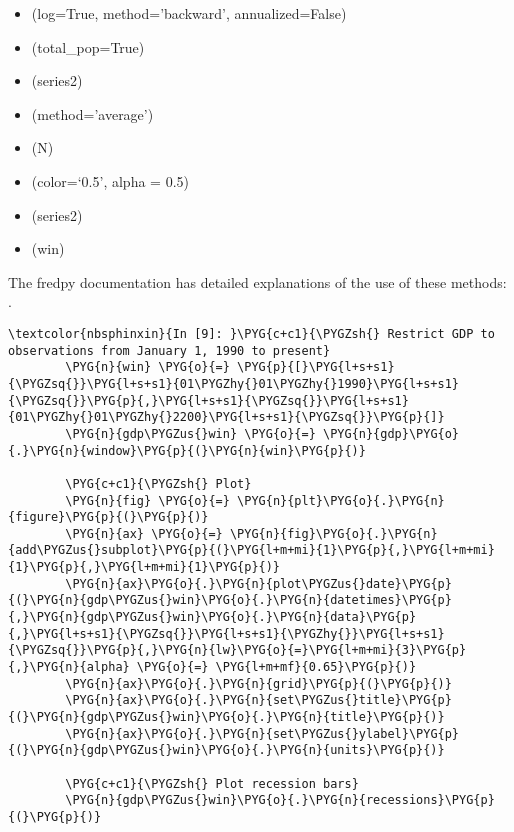 \documentclass[letterpaper,10pt,openany,oneside,english]{sphinxmanual}
\begin{document}
\begin{itemize}
\item {} 
(log=True, method=’backward’, annualized=False)

\item {} 
(total\_pop=True)

\item {} 
(series2)

\item {} 
(method=’average’)

\item {} 
(N)

\item {} 
(color=‘0.5’, alpha = 0.5)

\item {} 
(series2)

\item {} 
(win)

\end{itemize}

The fredpy documentation has detailed explanations of the use of these methods: .

%
\begin{Verbatim}[commandchars=\\\{\}]
\textcolor{nbsphinxin}{In [9]: }\PYG{c+c1}{\PYGZsh{} Restrict GDP to observations from January 1, 1990 to present}
        \PYG{n}{win} \PYG{o}{=} \PYG{p}{[}\PYG{l+s+s1}{\PYGZsq{}}\PYG{l+s+s1}{01\PYGZhy{}01\PYGZhy{}1990}\PYG{l+s+s1}{\PYGZsq{}}\PYG{p}{,}\PYG{l+s+s1}{\PYGZsq{}}\PYG{l+s+s1}{01\PYGZhy{}01\PYGZhy{}2200}\PYG{l+s+s1}{\PYGZsq{}}\PYG{p}{]}
        \PYG{n}{gdp\PYGZus{}win} \PYG{o}{=} \PYG{n}{gdp}\PYG{o}{.}\PYG{n}{window}\PYG{p}{(}\PYG{n}{win}\PYG{p}{)}
        
        \PYG{c+c1}{\PYGZsh{} Plot}
        \PYG{n}{fig} \PYG{o}{=} \PYG{n}{plt}\PYG{o}{.}\PYG{n}{figure}\PYG{p}{(}\PYG{p}{)}
        \PYG{n}{ax} \PYG{o}{=} \PYG{n}{fig}\PYG{o}{.}\PYG{n}{add\PYGZus{}subplot}\PYG{p}{(}\PYG{l+m+mi}{1}\PYG{p}{,}\PYG{l+m+mi}{1}\PYG{p}{,}\PYG{l+m+mi}{1}\PYG{p}{)}
        \PYG{n}{ax}\PYG{o}{.}\PYG{n}{plot\PYGZus{}date}\PYG{p}{(}\PYG{n}{gdp\PYGZus{}win}\PYG{o}{.}\PYG{n}{datetimes}\PYG{p}{,}\PYG{n}{gdp\PYGZus{}win}\PYG{o}{.}\PYG{n}{data}\PYG{p}{,}\PYG{l+s+s1}{\PYGZsq{}}\PYG{l+s+s1}{\PYGZhy{}}\PYG{l+s+s1}{\PYGZsq{}}\PYG{p}{,}\PYG{n}{lw}\PYG{o}{=}\PYG{l+m+mi}{3}\PYG{p}{,}\PYG{n}{alpha} \PYG{o}{=} \PYG{l+m+mf}{0.65}\PYG{p}{)}
        \PYG{n}{ax}\PYG{o}{.}\PYG{n}{grid}\PYG{p}{(}\PYG{p}{)}
        \PYG{n}{ax}\PYG{o}{.}\PYG{n}{set\PYGZus{}title}\PYG{p}{(}\PYG{n}{gdp\PYGZus{}win}\PYG{o}{.}\PYG{n}{title}\PYG{p}{)}
        \PYG{n}{ax}\PYG{o}{.}\PYG{n}{set\PYGZus{}ylabel}\PYG{p}{(}\PYG{n}{gdp\PYGZus{}win}\PYG{o}{.}\PYG{n}{units}\PYG{p}{)}
        
        \PYG{c+c1}{\PYGZsh{} Plot recession bars}
        \PYG{n}{gdp\PYGZus{}win}\PYG{o}{.}\PYG{n}{recessions}\PYG{p}{(}\PYG{p}{)}
\end{Verbatim}
\end{document}
